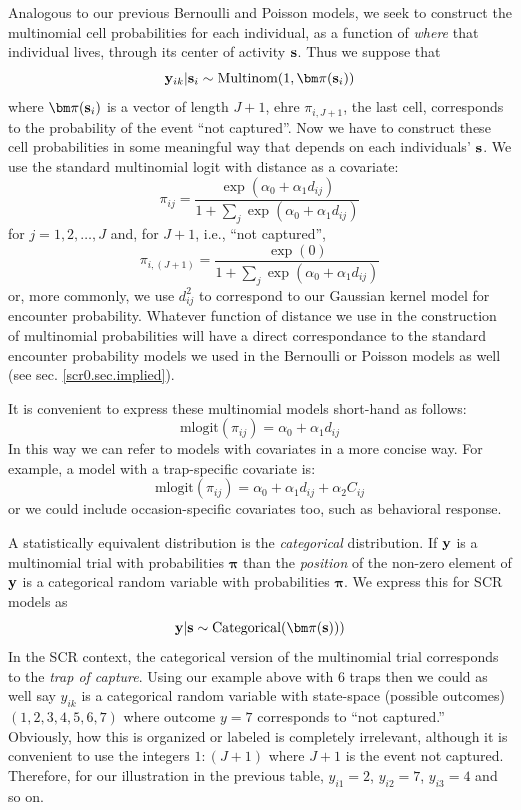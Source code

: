 Analogous to our previous Bernoulli and Poisson models, we seek to
construct the multinomial cell probabilities for each individual, as a
function of {\it where} that individual lives, through its center of
activity ${\bf s}$. Thus we suppose that
\begin{equation}
 {\bf y}_{ik}|{\bf s}_{i} \sim \mbox{Multinom}(1, {\bm \pi}({\bf s}_{i}) )
\label{poisson-mn.eq.mn}
\end{equation}
where ${\bm \pi}({\bf s}_{i})$ is a vector of length $J+1$, ehre
 $\pi_{i,J+1}$, the last cell, corresponds
 to the probability of the event ``not captured''.
Now we have to
construct these cell probabilities in some meaningful way that depends
on each individuals' ${\bf s}$.
We use the standard
multinomial logit with distance as a covariate:
\[
 \pi_{ij} = \frac{  \exp(\alpha_{0} + \alpha_{1} d_{ij}) }{ 1+ \sum_{j}
   \exp(\alpha_{0} + \alpha_{1} d_{ij})}
\]
for $j=1,2,\ldots,J$ and, for $J+1$, i.e., ``not captured'',
\[
 \pi_{i,(J+1)} = \frac{  \exp(0) }
                    { 1+ \sum_{j} \exp(\alpha_{0} + \alpha_{1} d_{ij})}
\]
or, more commonly, we use $d_{ij}^{2}$ to correspond to our Gaussian
kernel model for encounter probability. Whatever function of distance
we use in the construction of multinomial probabilities will have a
direct correspondance to the standard encounter probability models we
used in the Bernoulli or Poisson models as well (see
sec. \ref{scr0.sec.implied}). 

It is convenient to express these multinomial models short-hand as follows:
\[
\mbox{mlogit}( \pi_{ij} ) = \alpha_{0} + \alpha_{1} d_{ij}
\]
In this way we can refer to models with covariates in a more concise
way. For example, a model with a trap-specific covariate is:
\[
\mbox{mlogit}( \pi_{ij} ) = \alpha_{0} + \alpha_{1} d_{ij} + \alpha_{2} C_{ij}
\]
or we could include occasion-specific covariates too, such as
behavioral response. 

A statistically equivalent distribution is the {\it categorical}
distribution.  If ${\bf y}$ is a multinomial trial with probabilities
${\bm \pi}$ than the {\it position} of the non-zero element of ${\bf
  y}$ is a categorical random variable with probabilities ${\bm \pi}$.
We express this for SCR models as
\[
{\bf y}|{\bf s} \sim \mbox{Categorical}( {\bm \pi}({\bf s})) )
\]
In the SCR context, the categorical version of the
multinomial trial corresponds to the {\it trap of capture}.  Using our
example above with 6 traps then we
could as well say $y_{ik}$ is a categorical random variable with
state-space (possible outcomes) $(1,2,3,4,5,6,7)$ where outcome $y=7$
corresponds to ``not captured.'' Obviously, how this is organized or
labeled is completely irrelevant, although it is convenient to use the
integers $1:(J+1)$ where $J+1$ is the event not captured.  Therefore,
for our illustration in the previous table, $y_{i1} = 2$, $y_{i2} =
7$, $y_{i3} = 4$ and so on.

